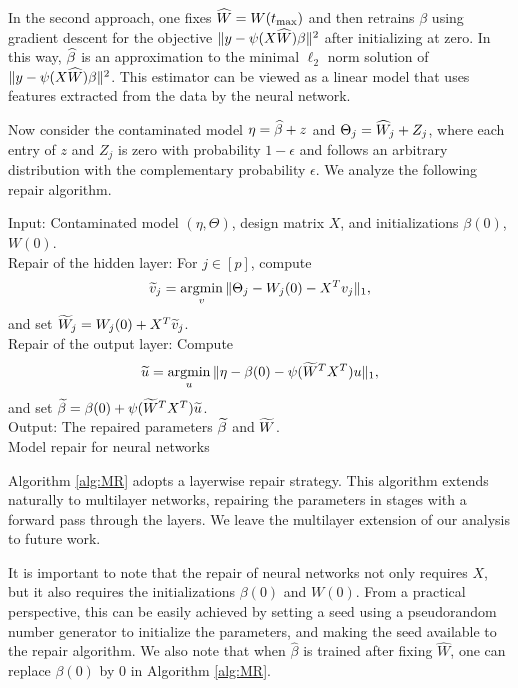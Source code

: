 In the second approach, one fixes $\widehat{W} = W(t_{\max})$ and then retrains $\beta$
using gradient descent for the objective $\|y-\psi(X\widehat{W})\beta\|^2$ after initializing at zero.
In this way, $\widehat{\beta}$ is an approximation to the minimal $\ell_2$ norm solution of $\|y-\psi(X\widehat{W})\beta\|^2$.
This estimator can be viewed as a linear model that uses features extracted from the data by the neural network.

Now consider the contaminated model $\eta=\widehat{\beta}+z$ and $\Theta_j=\widehat{W}_j+Z_j$, where each entry of $z$ and $Z_j$ is zero with probability $1-\epsilon$ and follows an arbitrary distribution with the complementary probability $\epsilon$. We analyze the following repair algorithm.

\vskip10pt
\begin{algorithm}[H]
\DontPrintSemicolon
\vskip5pt
\nl Input: Contaminated model $(\eta,\Theta)$, design matrix $X$, and initializations $\beta(0)$, $W(0)$. \\[3pt]
\nl Repair of the hidden layer: For $j\in[p]$, compute
$$\widetilde{v}_j=\mathop{\rm argmin}_v\|\Theta_j-W_j(0)-X^Tv_j\|_1,$$
and set $\widetilde{W}_j=W_j(0)+X^T\widetilde{v}_j$. \\[8pt]
\nl Repair of the output layer: Compute
$$\widetilde{u}=\mathop{\rm argmin}_u\|\eta-\beta(0)-\psi(\widetilde{W}^TX^T)u\|_1,$$
and set $\widetilde{\beta}=\beta(0)+\psi(\widetilde{W}^TX^T)\widetilde{u}$. \\[3pt]
\nl Output: The repaired parameters $\widetilde{\beta}$ and $\widetilde{W}$. \\[5pt]
\caption{Model repair for neural networks}\label{alg:MR}
\end{algorithm}
\vskip10pt

\begin{remark}
Algorithm \ref{alg:MR} adopts a layerwise repair strategy. This algorithm extends naturally to multilayer networks, repairing the parameters in stages with a forward pass through the layers. We leave the multilayer extension of our analysis to future work.
\end{remark}

\begin{remark}
It is important to note that the repair of neural networks not only requires $X$, but it also
requires the initializations $\beta(0)$ and $W(0)$. From a practical
perspective, this can be easily achieved by setting a seed using a pseudorandom number generator to initialize the
parameters, and making the seed available to the repair algorithm. We also note that when $\hat\beta$ is
trained after fixing $\hat W$, one can replace $\beta(0)$ by 0 in Algorithm \ref{alg:MR}.
\end{remark}

